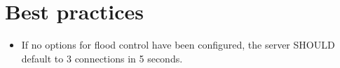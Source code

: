\chapter{Best practices}

\begin{itemize}
  \item{If no options for flood control have been configured, the server SHOULD
  default to 3 connections in 5 seconds.}
\end{itemize}

